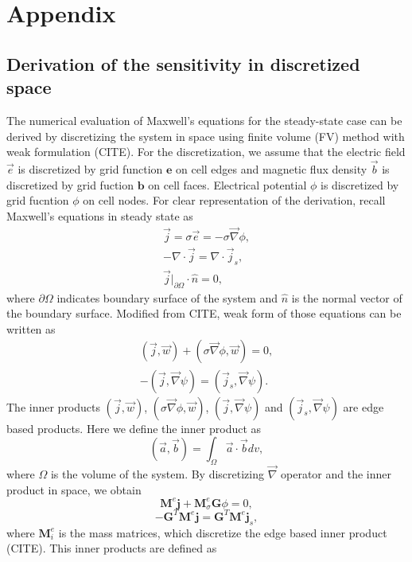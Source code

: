 \documentclass[a4paper, 11pt]{article}
\renewcommand{\div}{\nabla\cdot}
\newcommand{\grad}{\vec \nabla}
\newcommand{\dgrad}{{\mathbf G}}
\newcommand{\M}{{\mathbf M}}
\newcommand{\MeSig}{{\M^e_\sigma}}
\newcommand{\Me}{{\M^e}}
\renewcommand {\j}  { {\vec j} }
\renewcommand {\b}  { {\vec b} }
\newcommand {\e}  { {\vec e} }
\renewcommand {\dj}  { {\mathbf{j} } }
\newcommand {\db}  { {\mathbf{b} } }
\newcommand {\de}  { {\mathbf{e} } }
\begin{document}
\clearpage
\section{Appendix}
\subsection{Derivation of the sensitivity   in discretized space}
The numerical evaluation of Maxwell's equations for the steady-state case can be derived by discretizing the system in space using finite volume (FV) method with weak formulation (CITE). For the discretization, we assume that the electric field $\e$ is discretized by grid function $\de$ on cell edges and magnetic flux density $\b$ is discretized by grid fuction $\db$ on cell faces. Electrical potential $\phi$ is discretized by grid fucntion  $\phi$ on cell nodes. For clear representation of the derivation, recall Maxwell's equations in steady state as
\begin{align}
  \j = \sigma\e = -\sigma\grad \phi, \\
  -\div \j = \div \j_s, \\
  \j\big|_{\partial \Omega}\cdot\hat{n} = 0,
  \label{eq:DCBCneumann}
\end{align}
where $\partial \Omega$ indicates boundary surface of the system and $\hat{n}$ is the normal vector of the boundary surface. Modified from CITE, weak form of those equations can be written as
\begin{align}
  (\j, \vec{w}) + (\sigma \grad \phi, \vec{w}) = 0, \\
  -(\j, \grad \psi) = (\j_s, \grad \psi).
\end{align}
The inner products $(\j, \vec{w})$, $(\sigma \grad \phi, \vec{w})$,  $(\j, \grad \psi)$ and $(\j_s, \grad \psi)$ are edge based products. Here we define the inner product as
\begin{equation}
  (\vec{a}, \vec{b}) = \int_{\Omega} \vec{a}\cdot\vec{b} dv,
\end{equation}
where $\Omega$ is the volume of the system. By discretizing $\grad$ operator and the inner product in space, we obtain
\begin{equation}
  \Me\dj + \MeSig\dgrad\phi = 0,
  \label{eq:DCdisceq1}
\end{equation}
\begin{equation}
  -\dgrad^T \Me\dj = \dgrad^T \Me\dj_s,
  \label{eq:DCdisceq2}
\end{equation}
where $\mathbf{M}^e_i$ is the mass matrices, which discretize the edge based inner product (CITE). This inner products are defined  as
\end{document}
